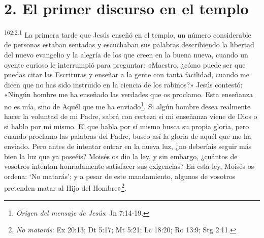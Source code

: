 \section*{2. El primer discurso en el templo}
\par 
\textsuperscript{162:2.1} La primera tarde que Jesús enseñó en el templo, un número considerable de personas estaban sentadas y escuchaban sus palabras describiendo la libertad del nuevo evangelio y la alegría de los que creen en la buena nueva, cuando un oyente curioso le interrumpió para preguntar: «Maestro, ¿cómo puede ser que puedas citar las Escrituras y enseñar a la gente con tanta facilidad, cuando me dicen que no has sido instruido en la ciencia de los rabinos?» Jesús contestó: «Ningún hombre me ha enseñado las verdades que os proclamo. Esta enseñanza no es mía, sino de Aquél que me ha enviado\footnote{\textit{Origen del mensaje de Jesús}: Jn 7:14-19.}. Si algún hombre desea realmente hacer la voluntad de mi Padre, sabrá con certeza si mi enseñanza viene de Dios o si hablo por mi mismo. El que habla por sí mismo busca su propia gloria, pero cuando proclamo las palabras del Padre, busco así la gloria de aquél que me ha enviado. Pero antes de intentar entrar en la nueva luz, ¿no deberíais seguir más bien la luz que ya poseéis? Moisés os dio la ley, y sin embargo, ¿cuántos de vosotros intentan honradamente satisfacer sus exigencias? En esta ley, Moisés os ordena: `No matarás'; y a pesar de este mandamiento, algunos de vosotros pretenden matar al Hijo del Hombre»\footnote{\textit{No matarás}: Ex 20:13; Dt 5:17; Mt 5:21; Lc 18:20; Ro 13:9; Stg 2:11.}.

